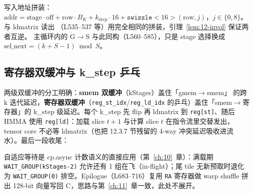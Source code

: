 

写入地址拼装：$\mathrm{addr} = \mathrm{stage}\cdot\mathrm{off} +
\mathrm{row}\cdot B_K + k_{\mathrm{step}}\cdot16 +
\texttt{swizzle}<16>(\mathrm{row}, j)$，$j\in\{0,8\}$。与 ldmatrix 读出
（L535--537 等）用完全相同的拼装，引理~\ref{lem:12-invol} 保证两者互逆。
主循环内的 G$\to$S 与此同构（L560--585），只是 stage 选择换成
$\mathrm{sel\_next}=(k{+}S{-}1)\bmod S$。

\subsection{寄存器双缓冲与 k\_step 乒乓}







两级双缓冲的分工明确：\textbf{smem 双缓冲}（kStages）盖住「gmem$\to$smem」
的跨 k 迭代延迟，\textbf{寄存器双缓冲}（\texttt{reg\_st\_idx}/\texttt{reg\_ld\_idx}
的乒乓）盖住「smem$\to$寄存器」的 k\_step 级延迟。每个 k\_step 先 flip 再
ldmatrix 到 \texttt{reg[st]}、随后 HMMA 使用 \texttt{reg[ld]}：加载 slice $t{+}1$
与计算 slice $t$ 在指令流里交替发出，tensor core 不必等 ldmatrix（也把
12.3.7 节残留的 4-way 冲突延迟吸收进流水）。最后一段收尾：



自适应等待是 cp.async 计数语义的直接应用（第~\ref{ch:10}~章）：满载期
\texttt{WAIT\_\allowbreak{}GROUP\allowbreak{}(k\allowbreak{}Stages-2)} 允许还有 1 组在飞（in-flight）；尾 tile 无新预取时退化为
\texttt{WAIT\_\allowbreak{}GROUP\allowbreak{}(0)} 排空。Epilogue（L683--716）复用 \texttt{RA} 寄存器做
warp shuffle 拼出 128-bit 向量写回 C，思路与第~\ref{ch:11}~章一致，此处不展开。

